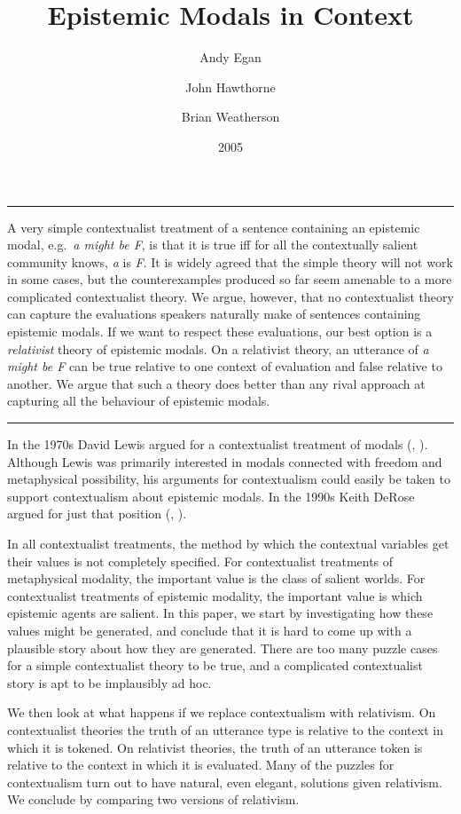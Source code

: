 \documentclass[
  10pt,
  letterpaper,
  DIV=11,
  numbers=noendperiod,
  twoside]{scrartcl}
\title{Epistemic Modals in Context}
\author{Andy Egan \and John Hawthorne \and Brian Weatherson}
\date{2005}
\renewenvironment{abstract}
 {\vspace{-1.25cm}
 \quotation\small\noindent\rule{\linewidth}{.5pt}\par\smallskip
 \noindent }
 {\par\noindent\rule{\linewidth}{.5pt}\endquotation}
\begin{document}
\maketitle
\begin{abstract}
A very simple contextualist treatment of a sentence containing an
epistemic modal, e.g.~\emph{a might be F}, is that it is true iff for
all the contextually salient community knows, \emph{a} is \emph{F}. It
is widely agreed that the simple theory will not work in some cases, but
the counterexamples produced so far seem amenable to a more complicated
contextualist theory. We argue, however, that no contextualist theory
can capture the evaluations speakers naturally make of sentences
containing epistemic modals. If we want to respect these evaluations,
our best option is a \emph{relativist} theory of epistemic modals. On a
relativist theory, an utterance of \emph{a might be F} can be true
relative to one context of evaluation and false relative to another. We
argue that such a theory does better than any rival approach at
capturing all the behaviour of epistemic modals.
\end{abstract}

In the 1970s David Lewis argued for a contextualist treatment of modals
(,
). Although Lewis was primarily
interested in modals connected with freedom and metaphysical
possibility, his arguments for contextualism could easily be taken to
support contextualism about epistemic modals. In the 1990s Keith DeRose
argued for just that position (,
).

In all contextualist treatments, the method by which the contextual
variables get their values is not completely specified. For
contextualist treatments of metaphysical modality, the important value
is the class of salient worlds. For contextualist treatments of
epistemic modality, the important value is which epistemic agents are
salient. In this paper, we start by investigating how these values might
be generated, and conclude that it is hard to come up with a plausible
story about how they are generated. There are too many puzzle cases for
a simple contextualist theory to be true, and a complicated
contextualist story is apt to be implausibly ad hoc.

We then look at what happens if we replace contextualism with
relativism. On contextualist theories the truth of an utterance type is
relative to the context in which it is tokened. On relativist theories,
the truth of an utterance token is relative to the context in which it
is evaluated. Many of the puzzles for contextualism turn out to have
natural, even elegant, solutions given relativism. We conclude by
comparing two versions of relativism.
\end{document}
